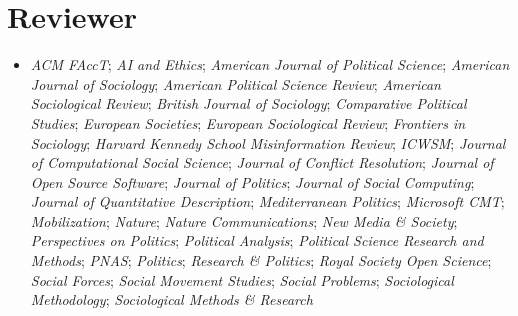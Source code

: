 \documentclass{resume}
\begin{document}

\section{Reviewer}
\begin{itemize}[parsep=0.5ex]
\item \textit{ACM FAccT}; \textit{AI and Ethics}; \textit{American Journal of Political Science}; \textit{American Journal of Sociology}; \textit{American Political Science Review}; \textit{American Sociological Review}; \textit{British Journal of Sociology}; \textit{Comparative Political Studies}; \textit{European Societies}; \textit{European Sociological Review}; \textit{Frontiers in Sociology}; \textit{Harvard Kennedy School Misinformation Review}; \textit{ICWSM}; \textit{Journal of Computational Social Science}; \textit{Journal of Conflict Resolution}; \textit{Journal of Open Source Software}; \textit{Journal of Politics}; \textit{Journal of Social Computing}; \textit{Journal of Quantitative Description}; \textit{Mediterranean Politics}; \textit{Microsoft CMT}; \textit{Mobilization}; \textit{Nature}; \textit{Nature Communications}; \textit{New Media \& Society}; \textit{Perspectives on Politics}; \textit{Political Analysis}; \textit{Political Science Research and Methods}; \textit{PNAS}; \textit{Politics}; \textit{Research \& Politics}; \textit{Royal Society Open Science}; \textit{Social Forces}; \textit{Social Movement Studies}; \textit{Social Problems}; \textit{Sociological Methodology}; \textit{Sociological Methods \& Research}
\end{itemize}

%
%
\end{document}
